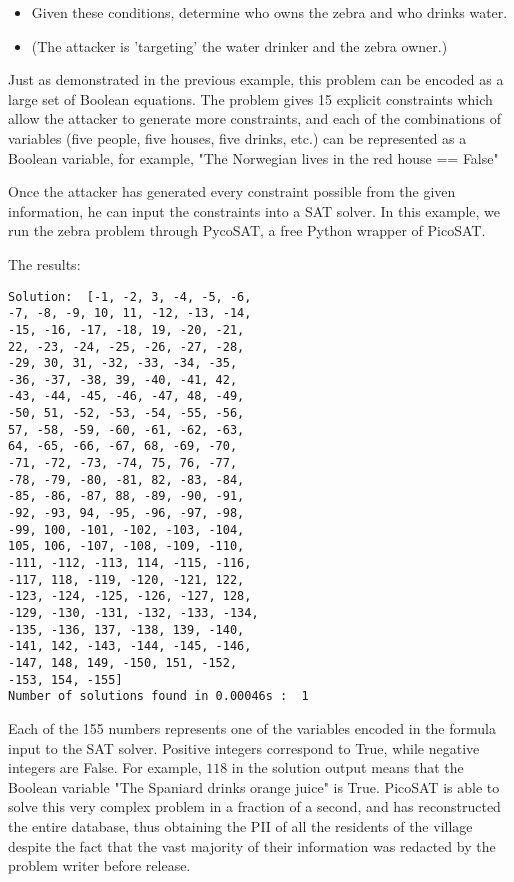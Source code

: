 \documentclass[jou,apacite]{apa6}
\begin{document}
\begin{itemize}
\item Given these conditions, determine who owns the zebra and who drinks water.
\item (The attacker is 'targeting' the water drinker and the zebra owner.)
\end{itemize}

Just as demonstrated in the previous example, this problem
can be encoded as a large set of Boolean equations. The problem
gives 15 explicit constraints which allow the attacker to generate more constraints, and each of the combinations of variables (five people, five houses, five drinks, etc.) can be represented as a Boolean variable, for example, "The Norwegian lives in the red house == False"

Once the attacker has generated every constraint possible from the given information, he can input the constraints into a SAT solver. In this example, we run the zebra problem through PycoSAT, a free Python wrapper of PicoSAT.

The results:

\begin{verbatim}
Solution:  [-1, -2, 3, -4, -5, -6,
-7, -8, -9, 10, 11, -12, -13, -14,
-15, -16, -17, -18, 19, -20, -21,
22, -23, -24, -25, -26, -27, -28,
-29, 30, 31, -32, -33, -34, -35,
-36, -37, -38, 39, -40, -41, 42,
-43, -44, -45, -46, -47, 48, -49,
-50, 51, -52, -53, -54, -55, -56,
57, -58, -59, -60, -61, -62, -63,
64, -65, -66, -67, 68, -69, -70,
-71, -72, -73, -74, 75, 76, -77,
-78, -79, -80, -81, 82, -83, -84,
-85, -86, -87, 88, -89, -90, -91,
-92, -93, 94, -95, -96, -97, -98,
-99, 100, -101, -102, -103, -104,
105, 106, -107, -108, -109, -110,
-111, -112, -113, 114, -115, -116,
-117, 118, -119, -120, -121, 122,
-123, -124, -125, -126, -127, 128,
-129, -130, -131, -132, -133, -134,
-135, -136, 137, -138, 139, -140,
-141, 142, -143, -144, -145, -146,
-147, 148, 149, -150, 151, -152,
-153, 154, -155]
Number of solutions found in 0.00046s :  1
\end{verbatim}

Each of the 155 numbers represents one of the variables encoded in the formula input to the SAT solver.
Positive integers correspond to True, while negative integers are False. For example, $118$ in the solution output means that the Boolean variable "The Spaniard drinks orange juice" is True.
PicoSAT is able to solve this very complex problem in a fraction of a second, and has reconstructed the entire database, thus obtaining the PII of all the residents of the village despite the fact that the vast majority of their information was redacted by the problem writer before release.
\end{document}
